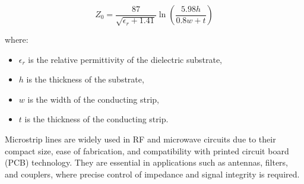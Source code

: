 \[
Z_0 = \frac{87}{\sqrt{\epsilon_r + 1.41}} \ln \left( \frac{5.98h}{0.8w + t} \right)
\]

where:
\begin{itemize}
    \item \( \epsilon_r \) is the relative permittivity of the dielectric substrate,
    \item \( h \) is the thickness of the substrate,
    \item \( w \) is the width of the conducting strip,
    \item \( t \) is the thickness of the conducting strip.
\end{itemize}

Microstrip lines are widely used in RF and microwave circuits due to their compact size, ease of fabrication, and compatibility with printed circuit board (PCB) technology. They are essential in applications such as antennas, filters, and couplers, where precise control of impedance and signal integrity is required.

